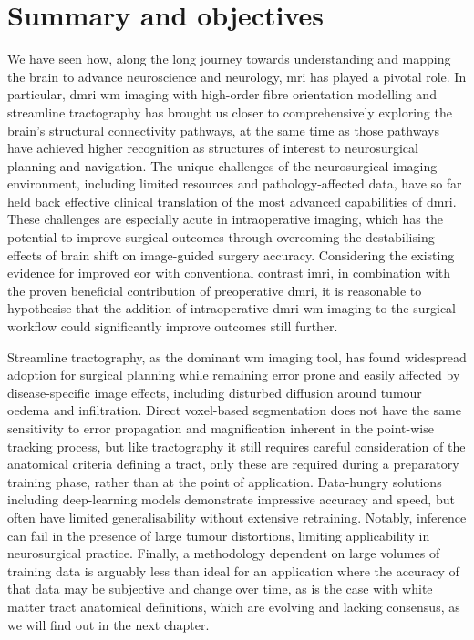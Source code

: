 \chapter{Summary and objectives}
\label{chap:problem}

We have seen how, along the long journey towards understanding and mapping the brain to advance neuroscience and neurology, \gls{mri} has played a pivotal role.
In particular, \gls{dmri} \gls{wm} imaging with high-order fibre orientation modelling and streamline tractography has brought us closer to comprehensively exploring the brain's structural connectivity pathways, at the same time as those pathways have achieved higher recognition as structures of interest to neurosurgical planning and navigation.
The unique challenges of the neurosurgical imaging environment, including limited resources and pathology-affected data, have so far held back effective clinical translation of the most advanced capabilities of \gls{dmri}.
These challenges are especially acute in intraoperative imaging, which has the potential to improve surgical outcomes through overcoming the destabilising effects of brain shift on image-guided surgery accuracy.
Considering the existing evidence for improved \gls{eor} with conventional contrast \gls{imri}, in combination with the proven beneficial contribution of preoperative \gls{dmri}, it is reasonable to hypothesise that the addition of intraoperative \gls{dmri} \gls{wm} imaging to the surgical workflow could significantly improve outcomes still further\autocite{Manan2022}.

Streamline tractography, as the dominant \gls{wm} imaging tool, has found widespread adoption for surgical planning while remaining error prone and easily affected by disease-specific image effects, including disturbed diffusion around tumour oedema and infiltration.
Direct voxel-based segmentation does not have the same sensitivity to error propagation and magnification inherent in the point-wise tracking process, but like tractography it still requires careful consideration of the anatomical criteria defining a tract, only these are required during a preparatory training phase, rather than at the point of application.
Data-hungry solutions including deep-learning models demonstrate impressive accuracy and speed, but often have limited generalisability without extensive retraining.
Notably, inference can fail in the presence of large tumour distortions, limiting applicability in neurosurgical practice.
Finally, a methodology dependent on large volumes of training data is arguably less than ideal for an application where the accuracy of that data may be subjective and change over time, as is the case with white matter tract anatomical definitions, which are evolving and lacking consensus, as we will find out in the next chapter.

